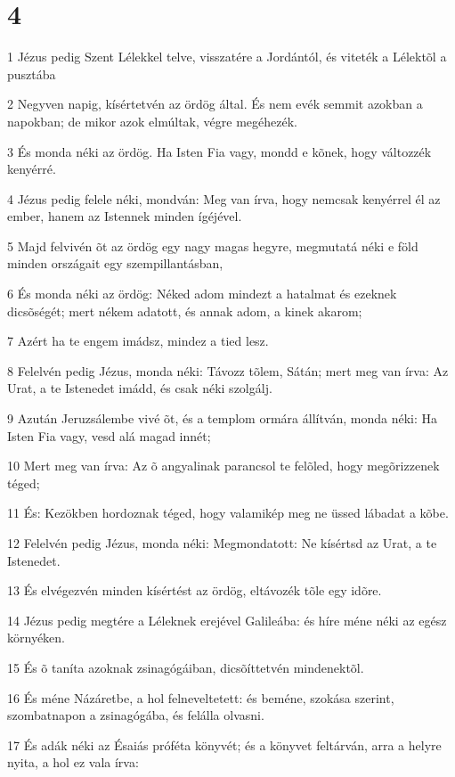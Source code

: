 \chapter{4}

\par 1 Jézus pedig Szent Lélekkel telve, visszatére a Jordántól, és viteték a  Lélektõl a pusztába
\par 2 Negyven napig, kísértetvén az ördög által. És nem evék semmit azokban a napokban; de mikor azok elmúltak, végre megéhezék.
\par 3 És monda néki az ördög. Ha Isten Fia vagy, mondd e kõnek, hogy változzék kenyérré.
\par 4 Jézus pedig felele néki, mondván: Meg van írva, hogy nemcsak kenyérrel él az ember, hanem az Istennek minden ígéjével.
\par 5 Majd felvivén õt az ördög egy nagy magas hegyre, megmutatá néki e föld minden országait egy szempillantásban,
\par 6 És monda néki az ördög: Néked adom mindezt a hatalmat és ezeknek dicsõségét; mert nékem adatott, és annak adom, a kinek akarom;
\par 7 Azért ha te engem imádsz, mindez a tied lesz.
\par 8 Felelvén pedig Jézus, monda néki: Távozz tõlem, Sátán; mert meg van írva: Az Urat, a te Istenedet imádd, és csak néki szolgálj.
\par 9 Azután Jeruzsálembe vivé õt, és a templom ormára állítván, monda néki: Ha Isten Fia vagy, vesd alá magad innét;
\par 10 Mert meg van írva: Az õ angyalinak parancsol te felõled, hogy megõrizzenek téged;
\par 11 És: Kezökben hordoznak téged, hogy valamikép meg ne üssed lábadat a kõbe.
\par 12 Felelvén pedig Jézus, monda néki: Megmondatott: Ne kísértsd az Urat, a te Istenedet.
\par 13 És elvégezvén minden kísértést az ördög, eltávozék tõle egy idõre.
\par 14 Jézus pedig megtére a Léleknek erejével Galileába: és híre méne néki az egész környéken.
\par 15 És õ taníta azoknak zsinagógáiban, dicsõíttetvén mindenektõl.
\par 16 És méne Názáretbe, a hol felneveltetett: és beméne, szokása szerint, szombatnapon a zsinagógába, és felálla olvasni.
\par 17 És adák néki az Ésaiás próféta könyvét; és a könyvet feltárván, arra a helyre nyita, a hol ez vala írva:
